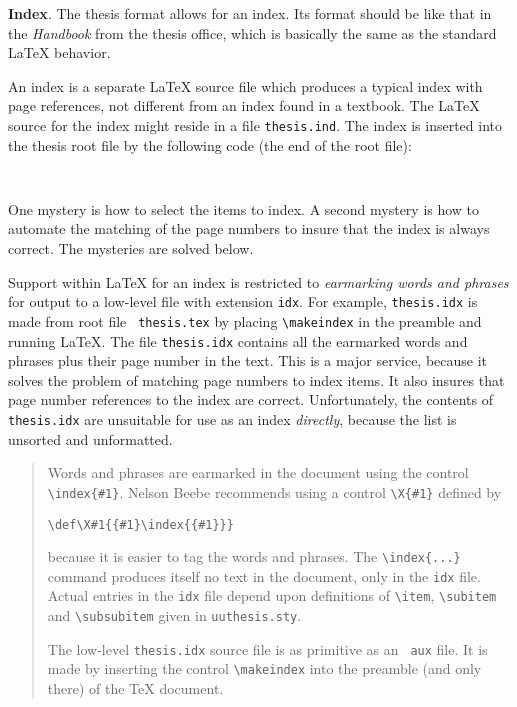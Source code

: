 {\bf Index}. The thesis format allows for an index.  Its format should
be like that in the {\em Handbook} from the thesis office, which is
basically the same as the standard \LaTeX{} behavior.

An index is a separate \LaTeX{} source file which produces a typical
index with page references, not different from an index found in a
textbook.
The \LaTeX{} source for the index might reside in a file
\verb|thesis.ind|. The index is inserted into the thesis root file
by the
following code (the end of the root file):

\verb|    |

One mystery is how to select the items to index. A second mystery is how
to automate the matching of the page numbers to insure that the index is
always correct. The mysteries are solved below.

Support within \LaTeX{} for an index is restricted to {\em earmarking
words and phrases} for output to a low-level file with extension
\verb|idx|. For example, {\tt thesis.idx} is made from root file {\tt
thesis.tex} by placing \verb"\makeindex" in the preamble and running
\LaTeX{}. The file {\tt thesis.idx} contains all the earmarked words and
phrases plus their page number in the text. This is a major service,
because it solves the problem of matching page numbers to index items.
It also insures that page number references to the index are correct.
Unfortunately, the contents of {\tt thesis.idx} are unsuitable for
use as an index {\em directly}, because the list is unsorted and
unformatted.

\begin{quote}
Words and phrases are earmarked in the document using the control
\verb"\index{#1}". Nelson Beebe recommends using a control \verb"\X{#1}"
defined by

\verb"\def\X#1{{#1}\index{{#1}}}"

because it is easier to tag the words and phrases. The
\verb"\index{...}" command produces itself no text in the document, only
in the {\tt idx} file. Actual entries in the {\tt idx} file depend upon
definitions of \verb"\item", \verb"\subitem" and \verb"\subsubitem"
given in {\tt uuthesis.sty}.

The low-level {\tt thesis.idx} source file is as primitive as an {\tt
aux} file. It is made by inserting the control \verb"\makeindex" into
the preamble (and only there) of the \TeX{} document.
\end{quote}

